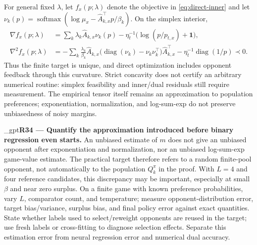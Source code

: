 \documentclass{article}
\newif\ifshowreviews
\newcommand{\reviewresponse}[1]{%
  \ifshowreviews
  \par\begingroup\color{blue!65!black}\hypersetup{allcolors=blue!65!black}\emergencystretch=2em%
  \noindent\textbf{Response:} #1\par\endgroup
  \fi}
\theoremstyle{remark}
\theoremstyle{plain}
\begin{document}
For general fixed $\lambda$, let $f_x(p;\lambda)$ denote the objective in \eqref{eq:direct-inner} and let
$\nu_k(p)=\operatorname{softmax}(\log\mu_x-\widehat A_{k,x}^{\top}p/\beta_k)$. On the simplex interior,
\begin{align*}
\nabla f_x(p;\lambda)
&=\sum_k\lambda_k\widehat A_{k,x}\nu_k(p)
-\eta_t^{-1}\bigl(\log(p/p_{t,x})+\mathbf1\bigr),\\
\nabla^2 f_x(p;\lambda)
&=-\sum_k\frac{\lambda_k}{\beta_k}\widehat A_{k,x}
\bigl(\operatorname{diag}(\nu_k)-\nu_k\nu_k^\top\bigr)\widehat A_{k,x}^\top
-\eta_t^{-1}\operatorname{diag}(1/p)\prec0.
\end{align*}
Thus the finite target is unique, and direct optimization includes opponent feedback through this curvature. Strict concavity does not certify an arbitrary numerical routine: simplex feasibility and inner/dual residuals still require measurement. The empirical tensor itself remains an approximation to population preferences; exponentiation, normalization, and log-sum-exp do not preserve unbiasedness of noisy margins.


\kekim_gpt{\textbf{R34 --- Quantify the approximation introduced before binary regression even starts.} An unbiased estimate of $m$ does not give an unbiased opponent after exponentiation and normalization, nor an unbiased log-sum-exp game-value estimate. The practical target therefore refers to a random finite-pool opponent, not automatically to the population $Q_k^\pi$ in the proof. With $L=4$ and four reference candidates, this discrepancy may be important, especially at small $\beta$ and near zero surplus. On a finite game with known preference probabilities, vary $L$, comparator count, and temperature; measure opponent-distribution error, target bias/variance, surplus bias, and final policy error against exact quantities. State whether labels used to select/reweight opponents are reused in the target; use fresh labels or cross-fitting to diagnose selection effects. Separate this estimation error from neural regression error and numerical dual accuracy.}
\reviewresponse{\textbf{R34 --- Partially addressed.} The target is explicitly a finite-pool teacher; nonlinear opponent normalization and game-value estimation need not be unbiased. Numerical, sampling and neural errors remain distinct. The planned controlled audit varies sampling and comparator counts and compares exact quantities, but no completed bias/variance or label-reuse/cross-fitting result is reported.}
\end{document}

